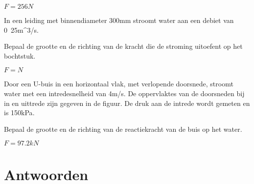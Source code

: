 	\begin{antwoord}
		$F = \unit{256}{N}$
	\end{antwoord}
	\begin{toepassing*}
		\label{45gradenbocht}
In een leiding met binnendiameter 300mm stroomt water aan een debiet van \unit{0.25}{m^3/s}.    

Bepaal de grootte en de richting van de kracht die de stroming uitoefent op het bochtstuk.
		\begin{center}
			
		\end{center}
	\end{toepassing*}
	\begin{antwoord}
		$F = \unit{}{N}$
	\end{antwoord}
	\begin{toepassing*}
		\label{diffusiebocht}
Door een U-buis in een horizontaal vlak, met verlopende doorsnede, stroomt water met een intredesnelheid van \unit{4}{m/s}. De oppervlaktes van de doorsneden bij in en uittrede zijn gegeven in de figuur. De druk aan de intrede wordt gemeten en is \unit{150}{kPa}.
		
Bepaal de grootte en de richting van de reactiekracht van de buis op het water.
		\begin{center}
			
		\end{center}
	\end{toepassing*}
	\begin{antwoord}
		$F = \unit{97.2}{kN}$
	\end{antwoord}
	
	\section*{Antwoorden}
	\begin{multicols}{2}
	\end{multicols}